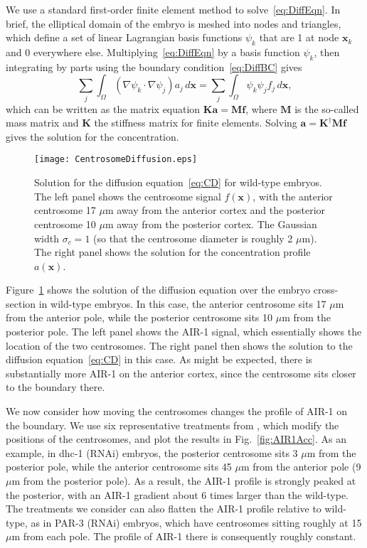 \documentclass[11pt]{article}
\newcommand{\V}[1]{\boldsymbol{#1}}                 %
\newcommand{\M}[1]{\boldsymbol{#1}}
\begin{document}
We use a standard first-order finite element method to solve\ \eqref{eq:DiffEqn}. In brief, the elliptical domain of the embryo is meshed into nodes and triangles, which define a set of linear Lagrangian basis functions $\psi_k$ that are 1 at node $\V{x}_k$ and 0 everywhere else. Multiplying\ \eqref{eq:DiffEqn} by a basis function $\psi_k$, then integrating by parts using the boundary condition\ \eqref{eq:DiffBC} gives 
\begin{equation}
\sum_j \int_{\Omega} \left(\nabla \psi_k \cdot \nabla \psi_j\right) a_j \, d\V{x}= \sum_j \int_{\Omega} \psi_k \psi_j f_j \, d\V{x},
\end{equation}
which can be written as the matrix equation $\M{K}\V{a}=\M{M}\V{f}$, where $\M{M}$ is the so-called mass matrix and $\M{K}$ the stiffness matrix for finite elements. Solving $\V{a}=\M{K}^\dagger \M{M}\V{f}$ gives the solution for the concentration.

\begin{figure}
\centering
\texttt{[image: CentrosomeDiffusion.eps]}
\caption{\label{fig:CentDiff} Solution for the diffusion equation\ \eqref{eq:CD} for wild-type embryos. The left panel shows the centrosome signal $f(\V x)$, with the anterior centrosome 17 $\mu$m away from the anterior cortex and the posterior centrosome 10 $\mu$m away from the posterior cortex. The Gaussian width $\sigma_c=1$ (so that the centrosome diameter is roughly 2 $\mu$m). The right panel shows the solution for the concentration profile $a(\V x)$. }
\end{figure}

Figure\ \ref{fig:CentDiff} shows the solution of the diffusion equation over the embryo cross-section in wild-type embryos. In this case, the anterior centrosome sits 17 $\mu$m from the anterior pole, while the posterior centrosome sits 10 $\mu$m from the posterior pole. The left panel shows the AIR-1 signal, which essentially shows the location of the two centrosomes. The right panel then shows the solution to the diffusion equation\ \eqref{eq:CD} in this case. As might be expected, there is substantially more AIR-1 on the anterior cortex, since the centrosome sits closer to the boundary there.

We now consider how moving the centrosomes changes the profile of AIR-1 on the boundary. We use six representative treatments from \cite{longhini2022aurora}, which modify the positions of the centrosomes, and plot the results in Fig.\ \ref{fig:AIR1Acc}. As an example, in dhc-1 (RNAi) embryos, the posterior centrosome sits 3 $\mu$m from the posterior pole, while the anterior centrosome sits 45 $\mu$m from the anterior pole (9 $\mu$m from the posterior pole). As a result, the AIR-1 profile is strongly peaked at the posterior, with an AIR-1 gradient about 6 times larger than the wild-type. The treatments we consider can also flatten the AIR-1 profile relative to wild-type, as in PAR-3 (RNAi) embryos, which have centrosomes sitting roughly at 15 $\mu$m from each pole. The profile of AIR-1 there is consequently roughly constant.
\end{document}
